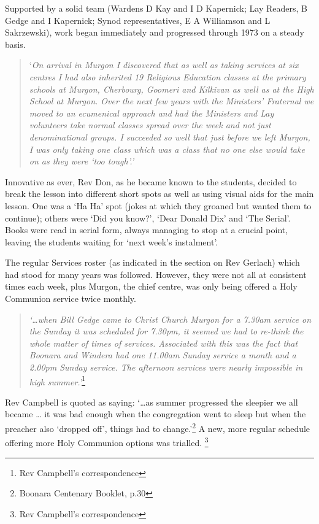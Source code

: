 Supported by a solid team (Wardens D Kay and I D Kapernick; Lay Readers,
B Gedge and I Kapernick; Synod representatives, E A Williamson and L
Sakrzewski), work began immediately and progressed through 1973 on a
steady basis.

\begin{quote}
`\emph{On arrival in Murgon I discovered that as well as taking services
at six centres I had also inherited 19 Religious Education classes at
the primary schools at Murgon, Cherbourg, Goomeri and Kilkivan as well
as at the High School at Murgon. Over the next few years with the
Ministers' Fraternal we moved to an ecumenical approach and had the
Ministers and Lay volunteers take normal classes spread over the week
and not just denominational groups. I succeeded so well that just before
we left Murgon, I was only taking one class which was a class that no
one else would take on as they were `too tough'.'}
\end{quote}

Innovative as ever, Rev Don, as he became known to the students, decided
to break the lesson into different short spots as well as using visual
aids for the main lesson. One was a `Ha Ha' spot (jokes at which they
groaned but wanted them to continue); others were `Did you know?', `Dear
Donald Dix' and `The Serial'. Books were read in serial form, always
managing to stop at a crucial point, leaving the students waiting for
`next week's instalment'.

The regular Services roster (as indicated in the section on Rev Gerlach)
which had stood for many years was followed. However, they were not all
at consistent times each week, plus Murgon, the chief centre, was only
being offered a Holy Communion service twice monthly.

\begin{quote}
\emph{`\ldots when Bill Gedge came to Christ Church Murgon for a 7.30am
service on the Sunday it was scheduled for 7.30pm, it seemed we had to
re-think the whole matter of times of services. Associated with this was
the fact that Boonara and Windera had one 11.00am Sunday service a month
and a 2.00pm Sunday service. The afternoon services were nearly
impossible in high summer.'}\footnote{Rev Campbell's correspondence}
\end{quote}

Rev Campbell is quoted as saying: `\ldots as summer progressed the
sleepier we all became \ldots{} it was bad enough when the congregation
went to sleep but when the preacher also `dropped off', things had to
change.'\footnote{Boonara Centenary Booklet, p.30} A new, more regular
schedule offering more Holy Communion options was trialled. \footnote{Rev
  Campbell's correspondence}

